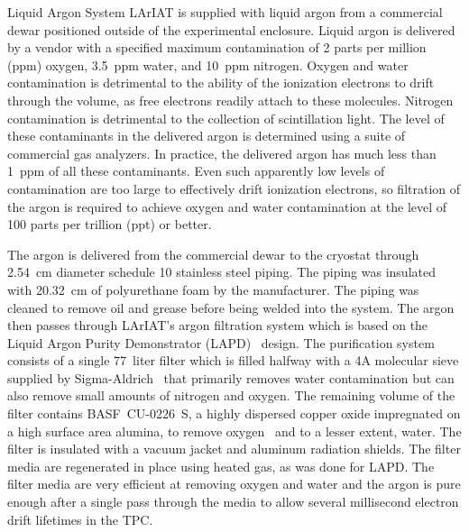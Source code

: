 \begin{subsubsection}{Liquid Argon System}\label{sec:LArCryoSystem}
LArIAT is supplied with liquid argon from a commercial dewar positioned outside of the experimental enclosure.  Liquid argon is delivered by a vendor with a specified maximum contamination of 2 parts per million (ppm) oxygen, 3.5~ppm water, and 10~ppm nitrogen. Oxygen and water contamination is detrimental to the ability of the ionization electrons to drift through the volume, as free electrons readily attach to these molecules. Nitrogen contamination is detrimental to the collection of scintillation light.  The level of these contaminants in the delivered argon is determined using a suite of commercial gas analyzers.  In practice, the delivered argon has much less than 1~ppm of all these contaminants.  Even such apparently low levels of contamination are too large to effectively drift ionization electrons, so filtration of the argon is required to achieve oxygen and water contamination at the level of 100 parts per trillion (ppt) or better. %

The argon is delivered from the commercial dewar to the cryostat through 2.54~cm diameter schedule 10 stainless steel piping.  The piping was insulated with 20.32~cm of polyurethane foam by the manufacturer.  The piping was cleaned to remove oil and grease before being welded into the system. The argon then passes through LArIAT's argon filtration system which is based on the Liquid Argon Purity Demonstrator (LAPD)~\cite{LAPD} design. The purification system consists of a single 77~liter filter which is filled halfway with a 4A molecular sieve supplied by Sigma-Aldrich~\cite{sigma-aldrich} that primarily removes water contamination but can also remove small amounts of nitrogen and oxygen. The remaining volume of the filter contains BASF~CU-0226~S, a highly dispersed copper oxide impregnated on a high surface area alumina, to remove oxygen~\cite{basf} and to a lesser extent, water.  The filter is insulated with a vacuum jacket and aluminum radiation shields.  The filter media are regenerated in place using heated gas, as was done for LAPD. The filter media are very efficient at removing oxygen and water and the argon is pure enough after a single pass through the media to allow several millisecond electron drift lifetimes in the TPC. 


\end{subsubsection}
